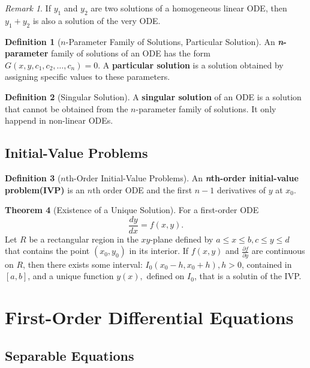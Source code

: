 \documentclass[12pt,a4paper]{report}
\theoremstyle{definition}
\newtheorem{theorem}{Theorem}[section]
\newtheorem{definition}[theorem]{Definition}
\theoremstyle{remark}
\newtheorem*{remark}{Remark}
\begin{document}
\begin{remark}
    If $y_1$ and $y_2$ are two solutions of a homogeneous linear ODE, then $y_1 + y_2$ is also a solution of the very ODE.  
\end{remark}

\begin{definition}[$n$-Parameter Family of Solutions, Particular Solution]
    An \textbf{\textit{n}-parameter} family of solutions of an ODE has the form $G(x, y, c_1, c_2, \ldots, c_n) = 0.$ A \textbf{particular solution} is a solution obtained by assigning specific values to these parameters. 
\end{definition}

\begin{definition}[Singular Solution]
    A \textbf{singular solution} of an ODE is a solution that cannot be obtained from the $n$-parameter family of solutions. It only happend in non-linear ODEs.
\end{definition}

\section{Initial-Value Problems}

\begin{definition}[$n$th-Order Initial-Value Problems]
    An \textbf{\textit{n}th-order initial-value problem(IVP)} is an $n$th order ODE and the first $n - 1$ derivatives of $y$ at $x_0.$
\end{definition}

\begin{theorem}[Existence of a Unique Solution]
    For a first-order ODE
    \[\frac{dy}{dx} = f(x, y).\]
    Let $R$ be a rectangular region in the $xy$-plane defined by $a \leq x \leq b, c \leq y \leq d$ that contains the point $(x_0, y_0)$ in its interior. If $f(x, y)$ and $\frac{\partial f}{\partial y}$ are continuous on $R$, then there exists some interval: $I_0(x_0 - h, x_0 + h), h> 0$, contained in $[a, b]$, and a unique function $y(x),$ defined on $I_0$, that is a solutin of the IVP.
\end{theorem}


\chapter{First-Order Differential Equations}

\section{Separable Equations}
\end{document}
